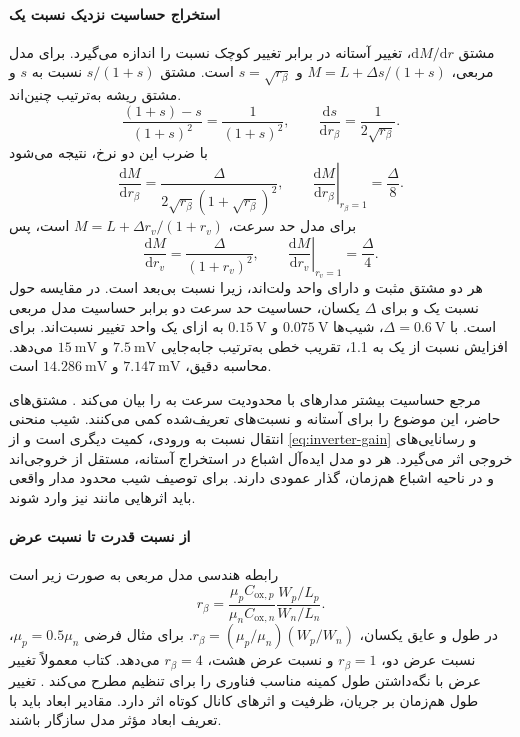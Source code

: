 \paragraph*{استخراج حساسیت نزدیک نسبت یک}
مشتق \(\mathrm{d}M/\mathrm{d}r\)، تغییر آستانه در برابر تغییر
کوچک نسبت را اندازه می‌گیرد. برای مدل مربعی،
\(M=L+\Delta s/(1+s)\) و \(s=\sqrt{r_\beta}\) است.
مشتق \(s/(1+s)\) نسبت به \(s\) و مشتق ریشه به‌ترتیب چنین‌اند.
\[
 \frac{(1+s)-s}{(1+s)^2}=\frac{1}{(1+s)^2},\qquad
 \frac{\mathrm{d}s}{\mathrm{d}r_\beta}=\frac{1}{2\sqrt{r_\beta}}.
\]
با ضرب این دو نرخ، نتیجه می‌شود
\begin{equation}
 \frac{\mathrm{d}M}{\mathrm{d}r_\beta}
 =\frac{\Delta}{2\sqrt{r_\beta}(1+\sqrt{r_\beta})^2},\qquad
 \left.\frac{\mathrm{d}M}{\mathrm{d}r_\beta}\right|_{r_\beta=1}
 =\frac{\Delta}{8}.
 \label{eq:beta-long-sensitivity}
\end{equation}
برای مدل حد سرعت، \(M=L+\Delta r_v/(1+r_v)\) است، پس
\begin{equation}
 \frac{\mathrm{d}M}{\mathrm{d}r_v}
 =\frac{\Delta}{(1+r_v)^2},\qquad
 \left.\frac{\mathrm{d}M}{\mathrm{d}r_v}\right|_{r_v=1}
 =\frac{\Delta}{4}.
 \label{eq:beta-velocity-sensitivity}
\end{equation}
هر دو مشتق مثبت و دارای واحد ولت‌اند، زیرا نسبت بی‌بعد است.
در مقایسه حول نسبت یک و برای \(\Delta\) یکسان، حساسیت حد سرعت
دو برابر حساسیت مدل مربعی است. با \(\Delta=\qty{0.6}{\volt}\)،
شیب‌ها \(\qty{0.075}{\volt}\) و \(\qty{0.15}{\volt}\) به ازای
یک واحد تغییر نسبت‌اند. برای افزایش نسبت از یک به \num{1.1}،
تقریب خطی به‌ترتیب جابه‌جایی \(\qty{7.5}{\milli\volt}\) و
\(\qty{15}{\milli\volt}\) می‌دهد. محاسبه دقیق،
\(\qty{7.147}{\milli\volt}\) و
\(\qty{14.286}{\milli\volt}\) است.

مرجع حساسیت بیشتر مدارهای با محدودیت سرعت به  را بیان
می‌کند \cite[پایان صفحه ۹۰]{weste}. مشتق‌های حاضر، این موضوع
را برای آستانه و نسبت‌های تعریف‌شده کمی می‌کنند.
شیب منحنی انتقال نسبت به ورودی، کمیت دیگری است و از
\eqref{eq:inverter-gain} و رسانایی‌های خروجی اثر می‌گیرد.
هر دو مدل ایده‌آل اشباع در استخراج آستانه، مستقل از خروجی‌اند و
در ناحیه اشباع هم‌زمان، گذار عمودی دارند. برای توصیف شیب محدود
مدار واقعی باید اثرهایی مانند  نیز وارد شوند.

\paragraph*{از نسبت قدرت تا نسبت عرض}
رابطه هندسی مدل مربعی به صورت زیر است
\begin{equation}
 r_\beta=\frac{\mu_pC_{\mathrm{ox},p}}{\mu_nC_{\mathrm{ox},n}}
          \frac{W_p/L_p}{W_n/L_n}.
 \label{eq:beta-geometry-ratio}
\end{equation}
در طول و عایق یکسان،
\(r_\beta=(\mu_p/\mu_n)(W_p/W_n)\).
برای مثال فرضی \(\mu_p=0.5\mu_n\)، نسبت عرض دو،
\(r_\beta=1\) و نسبت عرض هشت، \(r_\beta=4\) می‌دهد.
کتاب معمولاً تغییر عرض با نگه‌داشتن طول کمینه مناسب فناوری را
برای تنظیم  مطرح می‌کند \cite[صفحه ۹۰]{weste}.
تغییر طول هم‌زمان بر جریان، ظرفیت و اثرهای کانال کوتاه اثر دارد.
مقادیر ابعاد باید با تعریف ابعاد مؤثر مدل سازگار باشند.

